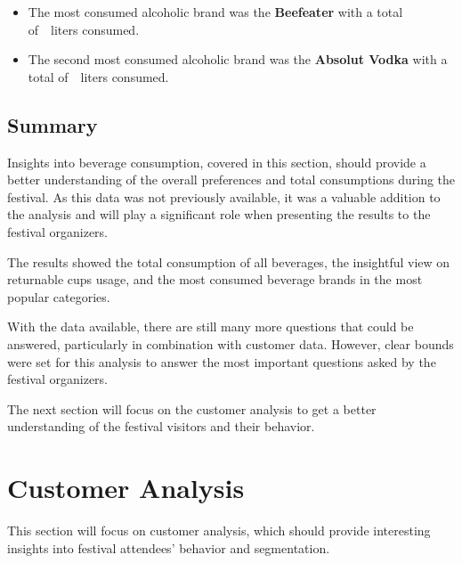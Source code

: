 \begin{keytakeaways}
	\begin{itemize}
		\item The most consumed alcoholic brand was the \textbf{Beefeater} with a total of~~liters consumed.
		\item The second most consumed alcoholic brand was the \textbf{Absolut Vodka} with a total of~~liters consumed.
	\end{itemize}
\end{keytakeaways}


\subsection{Summary}
\label{subsec:analysis-beverage-consumption-summary}

Insights into beverage consumption, covered in this section, should provide a better understanding of the overall preferences and total consumptions during the festival.
As this data was not previously available, it was a valuable addition to the analysis and will play a significant role when presenting the results to the festival organizers.

The results showed the total consumption of all beverages, the insightful view on returnable cups usage, and the most consumed beverage brands in the most popular categories.

With the data available, there are still many more questions that could be answered, particularly in combination with customer data.
However, clear bounds were set for this analysis to answer the most important questions asked by the festival organizers.

The next section will focus on the customer analysis to get a better understanding of the festival visitors and their behavior.



\section{Customer Analysis}
\label{sec:analysis-customers}

This section will focus on customer analysis, which should provide interesting insights into festival attendees' behavior and segmentation.

